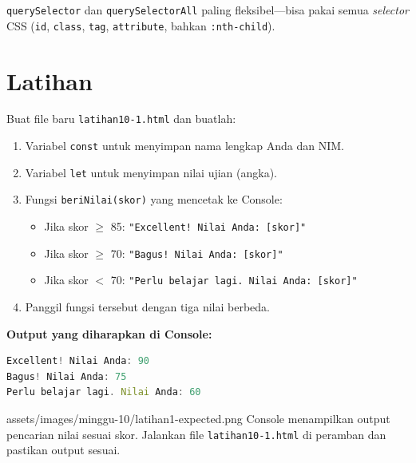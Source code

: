 \begin{tip}
\texttt{querySelector} dan \texttt{querySelectorAll} paling fleksibel---bisa pakai semua \emph{selector} CSS (\texttt{id}, \texttt{class}, \texttt{tag}, \texttt{attribute}, bahkan \texttt{:nth-child}).
\end{tip}

\section{Latihan}
\label{sec:10-latihan}

\begin{latihan}
Buat file baru \texttt{latihan10-1.html} dan buatlah:
\begin{enumerate}
  \item Variabel \texttt{const} untuk menyimpan nama lengkap Anda dan NIM.
  \item Variabel \texttt{let} untuk menyimpan nilai ujian (angka).
  \item Fungsi \texttt{beriNilai(skor)} yang mencetak ke Console:
  \begin{itemize}
    \item Jika skor $\geq$ 85: \texttt{"Excellent! Nilai Anda: [skor]"}
    \item Jika skor $\geq$ 70: \texttt{"Bagus! Nilai Anda: [skor]"}
    \item Jika skor $<$ 70: \texttt{"Perlu belajar lagi. Nilai Anda: [skor]"}
  \end{itemize}
  \item Panggil fungsi tersebut dengan tiga nilai berbeda.
\end{enumerate}

\textbf{Output yang diharapkan di Console:}
\begin{lstlisting}[language=JavaScript]
Excellent! Nilai Anda: 90
Bagus! Nilai Anda: 75
Perlu belajar lagi. Nilai Anda: 60
\end{lstlisting}

\begin{tangkapanlayar}
  {assets/images/minggu-10/latihan1-expected.png}
  {Console menampilkan output pencarian nilai sesuai skor.}
  {Jalankan file \texttt{latihan10-1.html} di peramban dan pastikan output sesuai.}
\end{tangkapanlayar}
\end{latihan}


